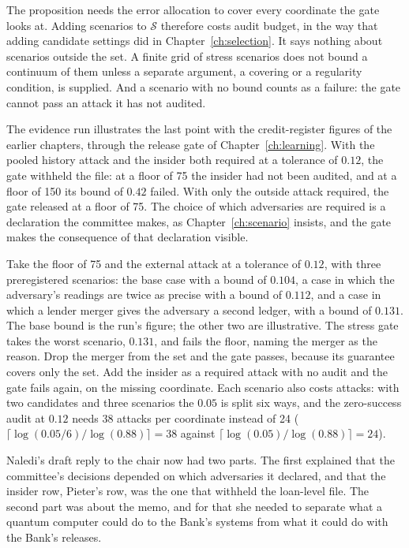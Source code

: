 The proposition needs the error allocation to cover every coordinate the gate looks at. Adding
scenarios to $\mathcal S$ therefore costs audit budget, in the way that adding candidate settings did in
Chapter~\ref{ch:selection}. It says nothing about scenarios outside the set. A finite grid of stress scenarios does not
bound a continuum of them unless a separate argument, a covering or a regularity condition, is
supplied. And a scenario with no bound counts as a failure: the gate cannot pass an attack it has
not audited.

The evidence run illustrates the last point with the credit-register figures of the earlier
chapters, through the release gate of Chapter~\ref{ch:learning}. With the pooled history attack and the insider
both required at a tolerance of $0.12$, the gate withheld the file: at a floor of 75 the insider had
not been audited, and at a floor of 150 its bound of $0.42$ failed. With only the outside attack
required, the gate released at a floor of 75. The choice of which adversaries are required is a
declaration the committee makes, as Chapter~\ref{ch:scenario} insists, and the gate makes the consequence of that
declaration visible.

\begin{example}\label{c21:ex-gate}
Take the floor of 75 and the external attack at a tolerance of $0.12$, with three preregistered
scenarios: the base case with a bound of $0.104$, a case in which the adversary's readings are twice
as precise with a bound of $0.112$, and a case in which a lender merger gives the adversary a second
ledger, with a bound of $0.131$. The base bound is the run's figure; the other two are illustrative.
The stress gate takes the worst scenario, $0.131$, and fails the floor, naming the merger as the
reason. Drop the merger from the set and the gate passes, because its guarantee covers only the set.
Add the insider as a required attack with no audit and the gate fails again, on the missing
coordinate. Each scenario also costs attacks: with two candidates and three scenarios the $0.05$ is
split six ways, and the zero-success audit at $0.12$ needs 38 attacks per coordinate instead of 24
($\lceil\log(0.05/6)/\log(0.88)\rceil=38$ against $\lceil\log(0.05)/\log(0.88)\rceil=24$).
\end{example}

Naledi's draft reply to the chair now had two parts. The first explained that the committee's
decisions depended on which adversaries it declared, and that the insider row, Pieter's row, was
the one that withheld the loan-level file. The second part was about the memo, and for that she
needed to separate what a quantum computer could do to the Bank's systems from what it could do
with the Bank's releases.

